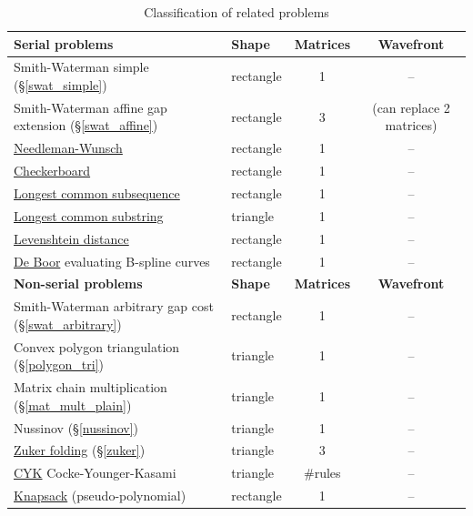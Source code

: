 \begin{table}[H]\begin{center}\begin{tabular}{llcc} \toprule
\bf Serial problems & \bf Shape & \bf Matrices & \bf Wavefront \\ \midrule
Smith-Waterman \footnotesize simple (\S\ref{swat_simple}) & rectangle & 1 & -- \\
Smith-Waterman \footnotesize affine gap extension (\S\ref{swat_affine}) & rectangle & 3 & (can replace 2 matrices) \\
\href{http://en.wikipedia.org/wiki/Needleman-Wunsch_algorithm}{Needleman-Wunsch} & rectangle & 1 & -- \\
\href{http://en.wikipedia.org/wiki/Dynamic_programming#Checkerboard}{Checkerboard} & rectangle & 1 & -- \\
\href{http://en.wikipedia.org/wiki/Longest_common_subsequence_problem\#Code_for_the_dynamic_programming_solution}{Longest common subsequence} & rectangle & 1 & -- \\
\href{http://en.wikipedia.org/wiki/Longest_common_substring_problem\#Pseudocode}{Longest common substring} & triangle & 1 & -- \\
\href{http://en.wikipedia.org/wiki/Levenshtein_distance\#Computing_Levenshtein_distance}{Levenshtein distance} & rectangle & 1 & -- \\
\href{http://en.wikipedia.org/wiki/De_Boor's_algorithm}{De Boor} \footnotesize evaluating B-spline curves & rectangle & 1 & -- \vspace{.4cm} \\
\toprule
\bf Non-serial problems & \bf Shape & \bf Matrices & \bf Wavefront \\ \midrule
Smith-Waterman \footnotesize arbitrary gap cost (\S\ref{swat_arbitrary}) & rectangle & 1 & -- \\
Convex polygon triangulation \footnotesize (\S\ref{polygon_tri}) & triangle & 1 & -- \\
Matrix chain multiplication \footnotesize (\S\ref{mat_mult_plain}) & triangle & 1 & -- \\
Nussinov \footnotesize (\S\ref{nussinov}) & triangle & 1 & -- \\
\href{http://rna.tbi.univie.ac.at/cgi-bin/RNAfold.cgi}{Zuker folding} \footnotesize (\S\ref{zuker}) & triangle & 3 & -- \\
\href{http://en.wikipedia.org/wiki/CYK_algorithm}{CYK} \footnotesize Cocke-Younger-Kasami & triangle & \#rules & -- \\
\href{http://en.wikipedia.org/wiki/Knapsack_problem#Dynamic_programming}{Knapsack} \footnotesize (pseudo-polynomial) & rectangle & 1 & --\\
\end{tabular}\end{center}
\caption{Classification of related problems}
\end{table}


